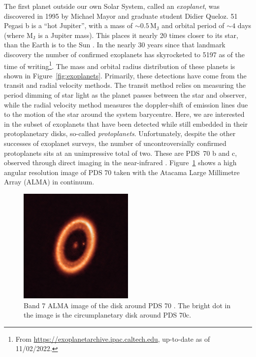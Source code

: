The first planet outside our own Solar System, called an \textit{exoplanet}, was discovered in 1995 by Michael Mayor and graduate student Didier Queloz.
51 Pegasi b is a ``hot Jupiter'', with a mass of $\sim 0.5 \, \mathrm{M_J}$ and orbital period of $\sim 4$ days (where $\mathrm{M_J}$ is a Jupiter mass).
This places it nearly 20 times closer to its star, than the Earth is to the Sun \citep{mayor1995}.
In the nearly 30 years since that landmark discovery the number of confirmed exoplanets has skyrocketed to 5197 as of the time of writing\footnote{From \url{https://exoplanetarchive.ipac.caltech.edu}, up-to-date as of 11/02/2022.}.
The mass and orbital radius distribution of these planets is shown in Figure~\ref{fig:exoplanets}.
Primarily, these detections have come from the transit and radial velocity methods.
The transit method relies on measuring the period dimming of star light as the planet passes between the star and observer, while the radial velocity method measures the doppler-shift of emission lines due to the motion of the star around the system barycentre.
Here, we are interested in the subset of exoplanets that have been detected while still embedded in their protoplanetary disks, so-called \textit{protoplanets}.
Unfortunately, despite the other successes of exoplanet surveys, the number of uncontroversially confirmed protoplanets sits at an unimpressive total of two.
These are PDS~70 b and c, observed through direct imaging in the near-infrared \citep{keppler2018,haffert2019}.
Figure~\ref{fig:pds70} shows a high angular resolution image of PDS 70 taken with the Atacama Large Millimetre Array (ALMA) in continuum.

\begin{figure}
    \centering
    \includegraphics[width = 0.5\textwidth]{figures/pds70.jpg}
    \caption{Band 7 ALMA image of the disk around PDS 70 \citep{benisty2021}. The bright dot in the image is the circumplanetary disk around PDS 70c.}
    \label{fig:pds70}
\end{figure}

